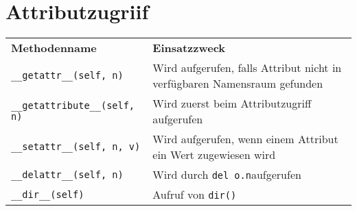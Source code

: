 \section{Attributzugriif}
\begin{tabular}{lp{8cm}}
\textbf{Methodenname}				&\textbf{Einsatzzweck}\\
\texttt{\_\_getattr\_\_(self, n)}			&Wird aufgerufen, falls Attribut nicht in verfügbaren Namensraum gefunden\\
\texttt{\_\_getattribute\_\_(self, n)}		&Wird zuerst beim Attributzugriff aufgerufen\\
\texttt{\_\_setattr\_\_(self, n, v)}			&Wird aufgerufen, wenn einem Attribut ein Wert zugewiesen wird\\
\texttt{\_\_delattr\_\_(self, n)}			&Wird durch \texttt{del o.n}aufgerufen\\
\texttt{\_\_dir\_\_(self)}				&Aufruf von \texttt{dir()}\\
\end{tabular}


